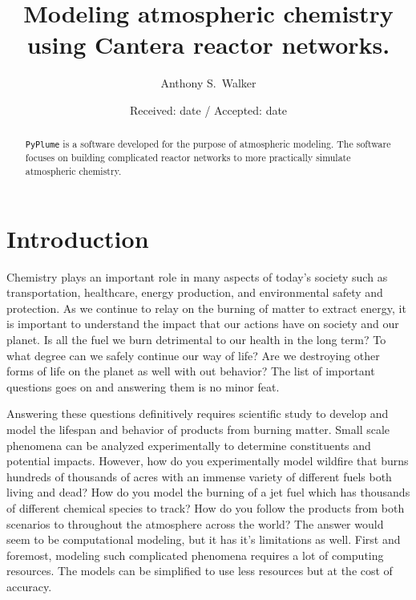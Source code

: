 \documentclass[smallextended,referee]{svjour3}
\begin{document}
\title{Modeling atmospheric chemistry using Cantera reactor networks.}


\author{Anthony S.~Walker}


\date{Received: date / Accepted: date}

\maketitle 

\begin{abstract}
\texttt{PyPlume} is a software developed for the purpose of atmospheric modeling. The software focuses on building complicated reactor networks to more practically simulate atmospheric chemistry. 
\end{abstract}


\section{Introduction}
Chemistry plays an important role in many aspects of today's society such as transportation, healthcare, energy production, and environmental safety and protection. As we continue to relay on the burning of matter to extract energy, it is important to understand the impact that our actions have on society and our planet. Is all the fuel we burn detrimental to our health in the long term? To what degree can we safely continue our way of life? Are we destroying other forms of life on the planet as well with out behavior? The list of important questions goes on and answering them is no minor feat.

Answering these questions definitively requires scientific study to develop and model the lifespan and behavior of products from burning matter. Small scale phenomena can be analyzed experimentally to determine constituents and potential impacts. However, how do you experimentally model wildfire that burns hundreds of thousands of acres with an immense variety of different fuels both living and dead? How do you model the burning of a jet fuel which has thousands of different chemical species to track? How do you follow the products from both scenarios to throughout the atmosphere across the world? The answer would seem to be computational modeling, but it has it's limitations as well. First and foremost, modeling such complicated phenomena requires a lot of computing resources. The models can be simplified to use less resources but at the cost of accuracy.
\end{document}
